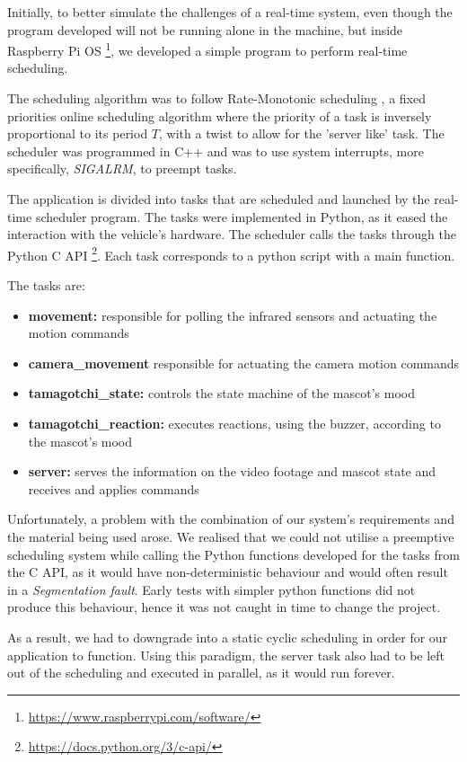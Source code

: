 \documentclass[conference]{IEEEtran}
\begin{document}
Initially, to better simulate the challenges of a real-time system, even though the program developed will not be running alone in the machine, but inside Raspberry Pi OS \footnote{\url{https://www.raspberrypi.com/software/}}, we developed a simple program to perform real-time scheduling.

The scheduling algorithm was to follow Rate-Monotonic scheduling \cite{b1}, a fixed priorities online scheduling algorithm where the priority of a task is inversely proportional to its period $T$, with a twist to allow for the 'server like' task. The scheduler was programmed in C++ and was to use system interrupts, more specifically, \textit{SIGALRM}, to preempt tasks. 

The application is divided into tasks that are scheduled and launched by the real-time scheduler program. The tasks were implemented in Python, as it eased the interaction with the vehicle's hardware. The scheduler calls the tasks through the Python C API \footnote{\url{https://docs.python.org/3/c-api/}}. Each task corresponds to a python script with a main function.

The tasks are:
\begin{itemize}
    \item \textbf{movement:} responsible for polling the infrared sensors and actuating the motion commands
    \item \textbf{camera\_movement} responsible for actuating the camera motion commands 
    \item \textbf{tamagotchi\_state:} controls the state machine of the mascot's mood
    \item \textbf{tamagotchi\_reaction:} executes reactions, using the buzzer, according to the mascot's mood
    \item \textbf{server:} serves the information on the video footage and mascot state and receives and applies commands
\end{itemize}

Unfortunately, a problem with the combination of our system's requirements and the material being used arose. We realised that we could not utilise a preemptive scheduling system while calling the Python functions developed for the tasks from the C API, as it would have non-deterministic behaviour and would often result in a \textit{Segmentation fault}. Early tests with simpler python functions did not produce this behaviour, hence it was not caught in time to change the project.

As a result, we had to downgrade into a static cyclic scheduling in order for our application to function. Using this paradigm, the server task also had to be left out of the scheduling and executed in parallel, as it would run forever.
\end{document}
